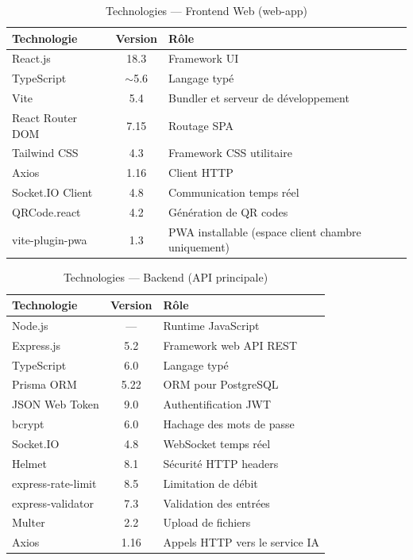 
\begin{table}[H]
\centering
\caption{Technologies — Frontend Web (web-app)}
\label{tab:tech_frontend}
\begin{tabular}{|l|c|p{7cm}|}
\hline
\textbf{Technologie} & \textbf{Version} & \textbf{Rôle} \\
\hline
React.js & 18.3 & Framework UI \\
\hline
TypeScript & $\sim$5.6 & Langage typé \\
\hline
Vite & 5.4 & Bundler et serveur de développement \\
\hline
React Router DOM & 7.15 & Routage SPA \\
\hline
Tailwind CSS & 4.3 & Framework CSS utilitaire \\
\hline
Axios & 1.16 & Client HTTP \\
\hline
Socket.IO Client & 4.8 & Communication temps réel \\
\hline
QRCode.react & 4.2 & Génération de QR codes \\
\hline
vite-plugin-pwa & 1.3 & PWA installable (espace client chambre uniquement) \\
\hline
\end{tabular}
\end{table}

\begin{table}[H]
\centering
\caption{Technologies — Backend (API principale)}
\label{tab:tech_backend}
\begin{tabular}{|l|c|p{7cm}|}
\hline
\textbf{Technologie} & \textbf{Version} & \textbf{Rôle} \\
\hline
Node.js & — & Runtime JavaScript \\
\hline
Express.js & 5.2 & Framework web API REST \\
\hline
TypeScript & 6.0 & Langage typé \\
\hline
Prisma ORM & 5.22 & ORM pour PostgreSQL \\
\hline
JSON Web Token & 9.0 & Authentification JWT \\
\hline
bcrypt & 6.0 & Hachage des mots de passe \\
\hline
Socket.IO & 4.8 & WebSocket temps réel \\
\hline
Helmet & 8.1 & Sécurité HTTP headers \\
\hline
express-rate-limit & 8.5 & Limitation de débit \\
\hline
express-validator & 7.3 & Validation des entrées \\
\hline
Multer & 2.2 & Upload de fichiers \\
\hline
Axios & 1.16 & Appels HTTP vers le service IA \\
\hline
\end{tabular}
\end{table}


